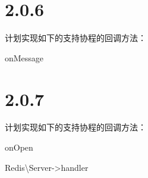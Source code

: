 \section{2.0.6}

计划实现如下的支持协程的回调方法：

\begin{compactitem}
\item onMessage
\end{compactitem}

\section{2.0.7}

计划实现如下的支持协程的回调方法：

\begin{compactitem}
\item onOpen
\item Redis\textbackslash Server->handler
\end{compactitem}






